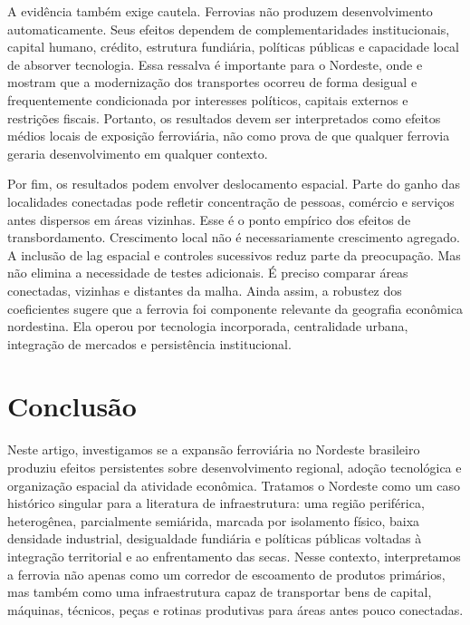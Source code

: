 \documentclass[12pt,a4paper]{article}
\begin{document}
A evidência também exige cautela. Ferrovias não produzem desenvolvimento automaticamente. Seus efeitos dependem de complementaridades institucionais, capital humano, crédito, estrutura fundiária, políticas públicas e capacidade local de absorver tecnologia. Essa ressalva é importante para o Nordeste, onde \citet{graham1968} e \citet{summerhill2003} mostram que a modernização dos transportes ocorreu de forma desigual e frequentemente condicionada por interesses políticos, capitais externos e restrições fiscais. Portanto, os resultados devem ser interpretados como efeitos médios locais de exposição ferroviária, não como prova de que qualquer ferrovia geraria desenvolvimento em qualquer contexto.

Por fim, os resultados podem envolver deslocamento espacial. Parte do ganho das localidades conectadas pode refletir concentração de pessoas, comércio e serviços antes dispersos em áreas vizinhas. Esse é o ponto empírico dos efeitos de transbordamento. Crescimento local não é necessariamente crescimento agregado. A inclusão de lag espacial e controles sucessivos reduz parte da preocupação. Mas não elimina a necessidade de testes adicionais. É preciso comparar áreas conectadas, vizinhas e distantes da malha. Ainda assim, a robustez dos coeficientes sugere que a ferrovia foi componente relevante da geografia econômica nordestina. Ela operou por tecnologia incorporada, centralidade urbana, integração de mercados e persistência institucional.

\section{Conclusão}

Neste artigo, investigamos se a expansão ferroviária no Nordeste brasileiro produziu efeitos persistentes sobre desenvolvimento regional, adoção tecnológica e organização espacial da atividade econômica. Tratamos o Nordeste como um caso histórico singular para a literatura de infraestrutura: uma região periférica, heterogênea, parcialmente semiárida, marcada por isolamento físico, baixa densidade industrial, desigualdade fundiária e políticas públicas voltadas à integração territorial e ao enfrentamento das secas. Nesse contexto, interpretamos a ferrovia não apenas como um corredor de escoamento de produtos primários, mas também como uma infraestrutura capaz de transportar bens de capital, máquinas, técnicos, peças e rotinas produtivas para áreas antes pouco conectadas.
\end{document}
